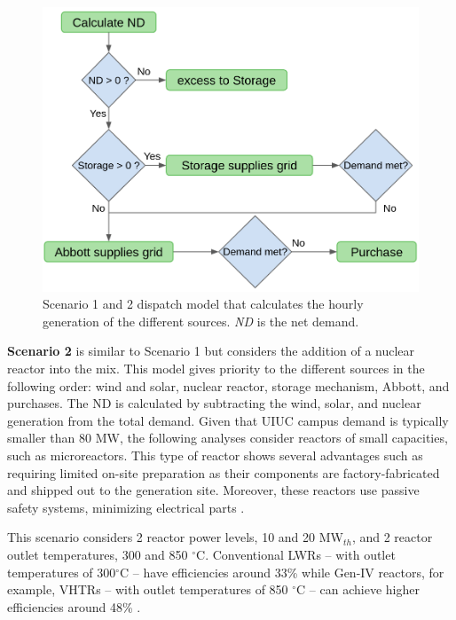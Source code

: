\documentclass{anstrans}
\begin{document}
\begin{figure}[htbp!] %
    \centering
    \includegraphics[width=0.90\linewidth]{figures/dispatch-model}
    \hfill
    \caption{Scenario 1 and 2 dispatch model that calculates the hourly generation of the different sources. \textit{ND} is the net demand.}
    \label{fig:dispatch-model}
\end{figure}

\textbf{Scenario 2} is similar to Scenario 1 but considers the addition of a nuclear reactor into the mix.
This model gives priority to the different sources in the following order: wind and solar, nuclear reactor, storage mechanism, Abbott, and purchases.
The \gls{ND} is calculated by subtracting the wind, solar, and nuclear generation from the total demand.
Given that UIUC campus demand is typically smaller than 80 MW, the following analyses consider reactors of small capacities, such as microreactors.
This type of reactor shows several advantages such as requiring limited on-site preparation as their components are factory-fabricated and shipped out to the generation site.
Moreover, these reactors use passive safety systems, minimizing electrical parts \cite{us-doe_ultimate_2019}.

This scenario considers 2 reactor power levels, 10 and 20 MW$_{th}$, and 2 reactor outlet temperatures, 300 and 850 $^\circ$C.
Conventional \glspl{LWR} -- with outlet temperatures of 300$^\circ$C -- have efficiencies around 33\% while Gen-IV reactors, for example, \glspl{VHTR} -- with outlet temperatures of 850 $^\circ$C -- can achieve higher efficiencies around 48\% \cite{fairhurst-agosta_multi-physics_2020}.
\end{document}
